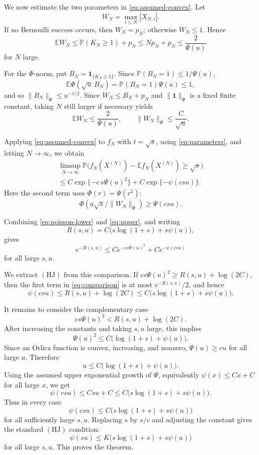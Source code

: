 \documentclass[11pt]{amsart}
\theoremstyle{remark}
\newcommand{\E}{\mathbb E}
\newcommand{\Pp}{\mathbb P}
\begin{document}
We now estimate the two parameters in \eqref{eq:assumed-convex}.  Let
\[
        W_N=\max_{i\le N}|X_{N,i}|.
\]
If no Bernoulli success occurs, then \(W_N=p_N\); otherwise \(W_N\le 1\).  Hence
\[
        \E W_N\le \Pp(K_N\ge 1)+p_N\le Np_N+p_N\le \frac{2}{\Psi(u)}
\]
for \(N\) large.

For the \(\Phi\)-norm, put \(B_N=\mathbf 1_{\{K_N\ge 1\}}\).  Since
\(\Pp(B_N=1)\le 1/\Psi(u)\),
\[
        \E \Phi(\sqrt{u}\,B_N)
        =
        \Pp(B_N=1)\Psi(u)
        \le 1,
\]
and so \(\|B_N\|_\Phi\le u^{-1/2}\).  Since \(W_N\le B_N+p_N\) and
\(\|\mathbf 1\|_\Phi\) is a fixed finite constant, taking \(N\) still larger
if necessary yields
\begin{equation}\label{eq:parameters}
        \E W_N\le \frac{2}{\Psi(u)},\qquad
        \|W_N\|_\Phi\le \frac{C}{\sqrt{u}} .
\end{equation}

Applying \eqref{eq:assumed-convex} to \(f_N\) with \(t=\sqrt{s}\), using
\eqref{eq:parameters}, and letting \(N\to\infty\), we obtain
\begin{multline}\label{eq:upper}
\limsup_{N\to\infty}
\Pp\bigl(f_N(X^{(N)})-\E f_N(X^{(N)})\ge \sqrt{s}\bigr)\\
\le
C\exp\{-c\,s\Psi(u)^2\}
+
C\exp\{-\psi(csu)\}.
\end{multline}
Here the second term uses \(\Phi(r)=\Psi(r^2)\):
\[
        \Phi\left(a\sqrt{s}/\|W_N\|_\Phi\right)
        \ge
        \Psi(csu).
\]

Combining \eqref{eq:poisson-lower} and \eqref{eq:upper}, and writing
\[
        R(s,u)=C\bigl(s\log(1+s)+s\psi(u)\bigr),
\]
gives
\begin{equation}\label{eq:comparison}
        e^{-R(s,u)}
        \le
        C e^{-c s\Psi(u)^2}
        +
        C e^{-\psi(csu)}
\end{equation}
for all large \(s,u\).

We extract \((\mathrm{HJ})\) from this comparison.  If
\(c s\Psi(u)^2\ge R(s,u)+\log(2C)\), then the first term in
\eqref{eq:comparison} is at most \(e^{-R(s,u)}/2\), and hence
\[
        \psi(csu)\le R(s,u)+\log(2C)
        \le C\bigl(s\log(1+s)+s\psi(u)\bigr).
\]

It remains to consider the complementary case
\[
        c s\Psi(u)^2< R(s,u)+\log(2C).
\]
After increasing the constants and taking \(s,u\) large, this implies
\[
        \Psi(u)^2\le C\bigl(\log(1+s)+\psi(u)\bigr).
\]
Since an Orlicz function is convex, increasing, and nonzero, \(\Psi(u)\ge c u\)
for all large \(u\).  Therefore
\[
        u\le C\bigl(\log(1+s)+\psi(u)\bigr).
\]
Using the assumed upper exponential growth of \(\Psi\), equivalently
\(\psi(x)\le Cx+C\) for all large \(x\), we get
\[
        \psi(csu)\le Csu+C
        \le C\bigl(s\log(1+s)+s\psi(u)\bigr).
\]
Thus in every case
\[
        \psi(csu)\le C\bigl(s\log(1+s)+s\psi(u)\bigr)
\]
for all sufficiently large \(s,u\).  Replacing \(s\) by \(s/c\) and adjusting
the constant gives the standard \((\mathrm{HJ})\) condition:
\[
        \psi(su)\le K\bigl(s\log(1+s)+s\psi(u)\bigr)
\]
for all large \(s,u\).  This proves the theorem.
\end{document}
